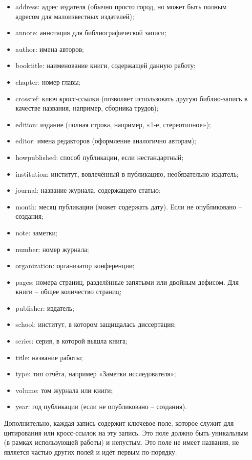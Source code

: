 \begin{itemize}
	\item address: адрес издателя (обычно просто город, но может быть полным адресом для малоизвестных издателей);
	\item annote: аннотация для библиографической записи;
	\item author: имена авторов;
	\item booktitle: наименование книги, содержащей данную работу;
	\item chapter: номер главы;
	\item crossref: ключ кросс-ссылки (позволяет использовать другую библио-запись в качестве названия, например, сборника трудов);
	\item edition: издание (полная строка, например, «1-е, стереотипное»);
	\item editor: имена редакторов (оформление аналогично авторам);
	\item howpublished: способ публикации, если нестандартный;
	\item institution: институт, вовлечённый в публикацию, необязательно издатель;
	\item journal: название журнала, содержащего статью;
	\item month: месяц публикации (может содержать дату). Если не опубликовано -- создания;
	\item note: заметки;
	\item number: номер журнала;
	\item organization: организатор конференции;
	\item pages: номера страниц, разделённые запятыми или двойным дефисом. Для книги -- общее количество страниц;
	\item publisher: издатель;
	\item school: институт, в котором защищалась диссертация;
	\item series: серия, в которой вышла книга;
	\item title: название работы;
	\item type: тип отчёта, например «Заметки исследователя»;
	\item volume: том журнала или книги;
	\item year: год публикации (если не опубликовано -- создания).
\end{itemize}

Дополнительно, каждая запись содержит ключевое поле, которое служит для цитирования или кросс-ссылок на эту запись. Это поле должно быть уникальным (в рамках использующей работы) и непустым. Это поле не имеет названия, не является частью других полей и идёт первым по-порядку.

